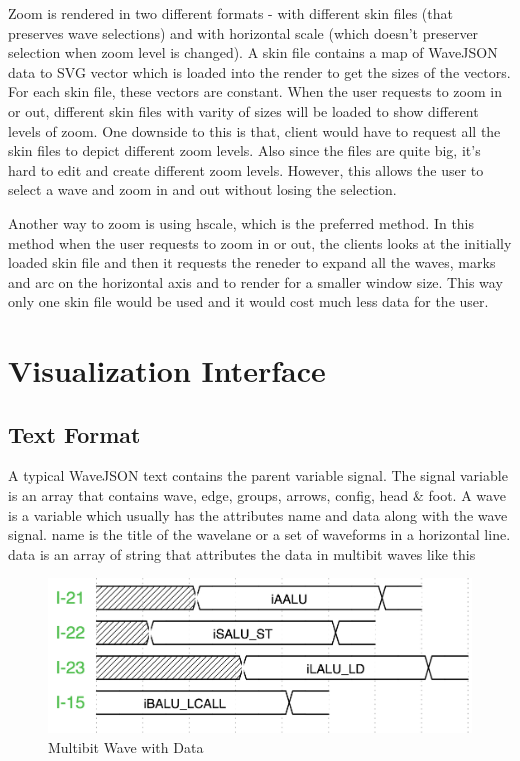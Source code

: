 \documentclass[14pt]{extarticle}
\begin{document}
\par Zoom is rendered in two different formats - with different skin files (that preserves wave selections) and with horizontal scale (which doesn't preserver selection when zoom level is changed). A skin  file contains a map of WaveJSON data to SVG vector which is loaded into the render to get the sizes of the vectors. For each skin file, these vectors are constant. When the user requests to zoom in or out, different skin files with varity of sizes will be loaded to show different levels of zoom. One downside to this is that, client would have to request all the skin files to depict different zoom levels. Also since the files are quite big, it's hard to edit and create different zoom levels. However, this allows the user to select a wave and zoom in and out without losing the selection.

\par Another way to zoom is using hscale, which is the preferred method. In this method when the user requests to zoom in or out, the clients looks at the initially loaded skin file and then it requests the reneder to expand all the waves, marks and arc on the horizontal axis and to render for a smaller window size. This way only one skin file would be used and it would cost much less data for the user.




\newpage
\section{Visualization Interface}
\subsection{Text Format}
A typical WaveJSON text contains the parent variable signal. The signal variable is an array that contains wave, edge, groups, arrows, config, head \& foot. A wave is a variable which usually has the attributes name and data along with the wave signal. name is the title of the wavelane or a set of waveforms in a horizontal line. data is an array of string that attributes the data in multibit waves like this

\begin{figure}[H]
    \centering
    \includegraphics[scale=0.7]{wave}
    \caption{Multibit Wave with Data}
    \label{fig:wave_data}
\end{figure}
\end{document}

